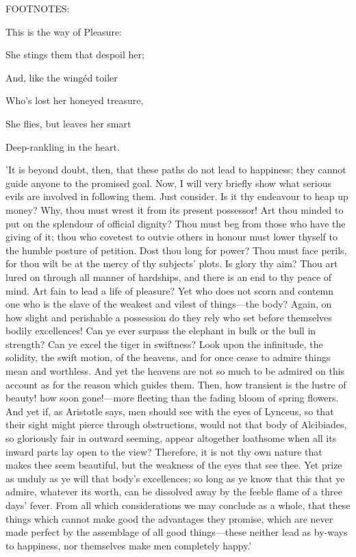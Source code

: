 FOOTNOTES:


This is the way of Pleasure:

She stings them that despoil her;

And, like the wingéd toiler

Who's lost her honeyed treasure,

She flies, but leaves her smart

Deep-rankling in the heart.


'It is beyond doubt, then, that these paths do not lead to happiness;
they cannot guide anyone to the promised goal. Now, I will very briefly
show what serious evils are involved in following them. Just consider.
Is it thy endeavour to heap up money? Why, thou must wrest it from its
present possessor! Art thou minded to put on the splendour of official
dignity? Thou must beg from those who have the giving of it; thou who
covetest to outvie others in honour must lower thyself to the humble
posture of petition. Dost thou long for power? Thou must face perils,
for thou wilt be at the mercy of thy subjects' plots. Is glory thy aim?
Thou art lured on through all manner of hardships, and there is an end
to thy peace of mind. Art fain to lead a life of pleasure? Yet who does
not scorn and contemn one who is the slave of the weakest and vilest of
things—the body? Again, on how slight and perishable a possession do
they rely who set before themselves bodily excellences! Can ye ever
surpass the elephant in bulk or the bull in strength? Can ye excel the
tiger in swiftness? Look upon the infinitude, the solidity, the swift
motion, of the heavens, and for once cease to admire things mean and
worthless. And yet the heavens are not so much to be admired on this
account as for the reason which guides them. Then, how transient is the
lustre of beauty! how soon gone!—more fleeting than the fading bloom of
spring flowers. And yet if, as Aristotle says, men should see with the
eyes of Lynceus, so that their sight might pierce through obstructions,
would not that body of Alcibiades, so gloriously fair in outward
seeming, appear altogether loathsome when all its inward parts lay open
to the view? Therefore, it is not thy own nature that makes thee seem
beautiful, but the weakness of the eyes that see thee. Yet prize as
unduly as ye will that body's excellences; so long as ye know that this
that ye admire, whatever its worth, can be dissolved away by the feeble
flame of a three days' fever. From all which considerations we may
conclude as a whole, that these things which cannot make good the
advantages they promise, which are never made perfect by the assemblage
of all good things—these neither lead as by-ways to happiness, nor
themselves make men completely happy.'

